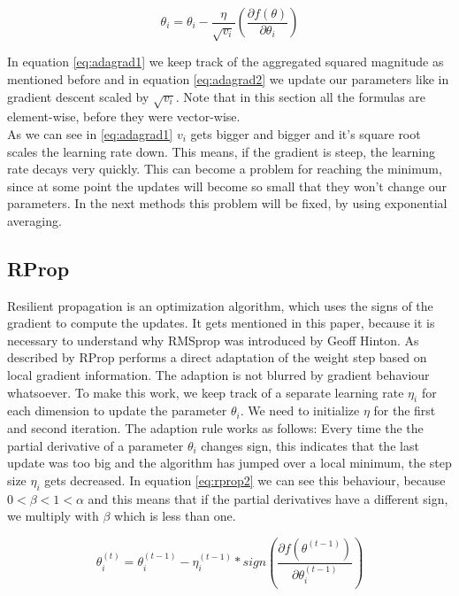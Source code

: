 \documentclass[aodsor,preprint]{imsart}
\numberwithin{equation}{section}
\theoremstyle{plain}
\begin{document}
\begin{equation} \label{eq:adagrad2}
\theta_{i} = \theta_{i} - \frac{\eta}{\sqrt{v_{i}}} \left(\frac{\partial f(\theta)}{\partial \theta_{i}} \right)
\end{equation}

In equation \ref{eq:adagrad1} we keep track of the aggregated squared magnitude as mentioned before and in equation \ref{eq:adagrad2} we update our parameters like in gradient descent scaled by $\sqrt{v_{i}}$. Note that in this section all the formulas are element-wise, before they were vector-wise. \\
As we can see in \ref{eq:adagrad1} $v_{i}$ gets bigger and bigger and it's square root scales the learning rate down. This means, if the gradient is steep, the learning rate decays very quickly. This can become a problem for reaching the minimum, since at some point the updates will become so small that they won't change our parameters. In the next methods this problem will be fixed, by using exponential averaging.

\subsection{RProp}
Resilient propagation is an optimization algorithm, which uses the signs of the gradient to compute the updates. It gets mentioned in this paper, because it is necessary to understand why RMSprop was introduced by Geoff Hinton. As described by \cite{RiedmillerM1993Adam} RProp performs a direct adaptation of the weight step based on local gradient information. The adaption is not blurred by gradient behaviour whatsoever. To make this work, we keep track of a separate learning rate $\eta_{i}$ for each dimension to update the parameter $\theta_{i}$. We need to initialize $\eta$ for the first and second iteration. The adaption rule works as follows: Every time the the partial derivative of a parameter $\theta_{i}$ changes sign, this indicates that the last update was too big and the algorithm has jumped over a local minimum, the step size $\eta_{i}$ gets decreased. In equation \ref{eq:rprop2} we can see this behaviour, because $0<\beta<1<\alpha$ and this means that if the partial derivatives have a different sign, we multiply with $\beta$ which is less than one.

\begin{equation} \label{eq:rprop1}
\theta_{i}^{(t)} = \theta_{i}^{(t-1)} - \eta_{i}^{(t-1)}*sign\left(\frac{\partial f(\theta^{(t-1)})}{\partial \theta_{i}^{(t-1)}} \right)
\end{equation}
\end{document}
